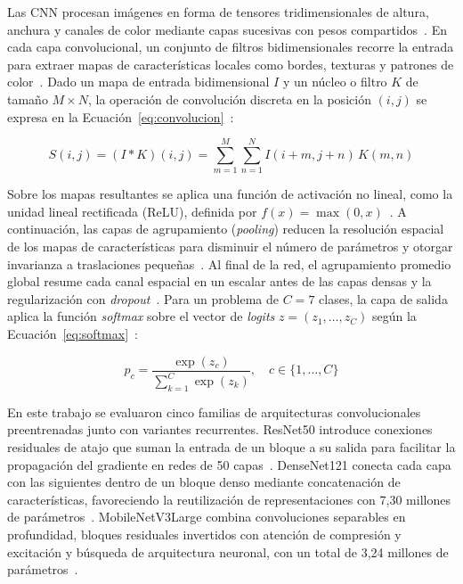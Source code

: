 Las CNN procesan imágenes en forma de tensores tridimensionales de altura, anchura y canales de color mediante capas sucesivas con pesos compartidos~\cite{goodfellow2016deep,zhang2024dive}. En cada capa convolucional, un conjunto de filtros bidimensionales recorre la entrada para extraer mapas de características locales como bordes, texturas y patrones de color~\cite{goodfellow2016deep}. Dado un mapa de entrada bidimensional $I$ y un núcleo o filtro $K$ de tamaño $M \times N$, la operación de convolución discreta en la posición $(i, j)$ se expresa en la Ecuación~\ref{eq:convolucion}~\cite{goodfellow2016deep}:

\begin{equation}
  S(i, j) = (I * K)(i, j) = \sum_{m=1}^{M} \sum_{n=1}^{N} I(i + m, j + n)\,K(m, n)
  \label{eq:convolucion}
\end{equation}

Sobre los mapas resultantes se aplica una función de activación no lineal, como la unidad lineal rectificada (ReLU), definida por $f(x) = \max(0, x)$~\cite{goodfellow2016deep,zhang2024dive}. A continuación, las capas de agrupamiento (\textit{pooling}) reducen la resolución espacial de los mapas de características para disminuir el número de parámetros y otorgar invarianza a traslaciones pequeñas~\cite{goodfellow2016deep}. Al final de la red, el agrupamiento promedio global resume cada canal espacial en un escalar antes de las capas densas y la regularización con \textit{dropout}~\cite{zhang2024dive}. Para un problema de $C = 7$ clases, la capa de salida aplica la función \textit{softmax} sobre el vector de \textit{logits} $z = (z_1, \dots, z_C)$ según la Ecuación~\ref{eq:softmax}~\cite{goodfellow2016deep}:

\begin{equation}
  p_c = \frac{\exp(z_c)}{\sum_{k=1}^{C} \exp(z_k)}, \quad c \in \{1, \dots, C\}
  \label{eq:softmax}
\end{equation}

En este trabajo se evaluaron cinco familias de arquitecturas convolucionales preentrenadas junto con variantes recurrentes. ResNet50 introduce conexiones residuales de atajo que suman la entrada de un bloque a su salida para facilitar la propagación del gradiente en redes de 50 capas~\cite{he2016resnet}. DenseNet121 conecta cada capa con las siguientes dentro de un bloque denso mediante concatenación de características, favoreciendo la reutilización de representaciones con 7,30 millones de parámetros~\cite{huang2017densenet}. MobileNetV3Large combina convoluciones separables en profundidad, bloques residuales invertidos con atención de compresión y excitación y búsqueda de arquitectura neuronal, con un total de 3,24 millones de parámetros~\cite{howard2019mobilenetv3}.

